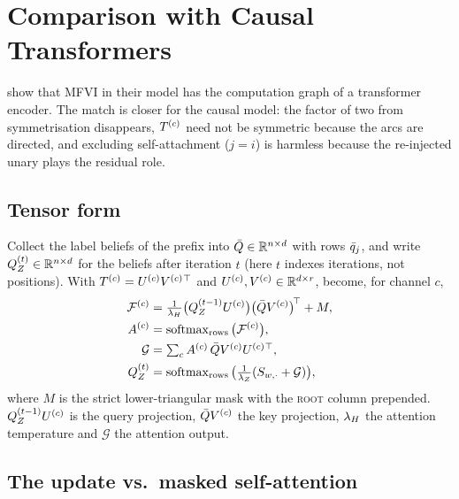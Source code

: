 \section{Comparison with Causal Transformers}
\label{sec:comparison}

\citet{wu2023probabilistic} show that MFVI in their model has the computation graph of a
transformer encoder. The match is closer for the causal model: the factor of two from
symmetrisation disappears, $T^{(c)}$ need not be symmetric because the arcs are directed, and
excluding self-attachment ($j=i$) is harmless because the re-injected unary plays the residual
role.

\subsection{Tensor form}
\label{sec:tensor-form}

Collect the label beliefs of the prefix into $\bar{Q} \in \mathbb{R}^{n \times d}$ with rows
$\bar{q}_{j}$, and write $Q_Z^{(t)} \in \mathbb{R}^{n\times d}$ for the beliefs after iteration
$t$ (here $t$ indexes iterations, not positions).
With $T^{(c)} = U^{(c)}V^{(c)}{}^{\top}$ and $U^{(c)},V^{(c)} \in \mathbb{R}^{d\times r}$,
 become, for channel $c$,
%
\begin{equation}
\label{eq:tensor}
\begin{aligned}
  \mathcal{F}^{(c)} &= \tfrac{1}{\lambda_H}\big(Q_Z^{(t-1)}U^{(c)}\big)\big(\bar{Q}V^{(c)}\big)^{\!\top}
      + M, \\
  A^{(c)} &= \operatorname{softmax}_{\text{rows}}\big(\mathcal{F}^{(c)}\big), \\
  \mathcal{G} &= \textstyle\sum_c A^{(c)}\, \bar{Q}V^{(c)}U^{(c)}{}^{\top}, \\
  Q_Z^{(t)} &= \operatorname{softmax}_{\text{rows}}\big(\tfrac{1}{\lambda_Z}(S_{w,\cdot} + \mathcal{G})\big),
\end{aligned}
\end{equation}
%
where $M$ is the strict lower-triangular mask with the \textsc{root} column prepended.
$Q_Z^{(t-1)}U^{(c)}$ is the query projection, $\bar{Q}V^{(c)}$ the key projection, $\lambda_H$ the
attention temperature and $\mathcal{G}$ the attention output.

\subsection{The update vs.\ masked self-attention}
\label{sec:vs-attention}

